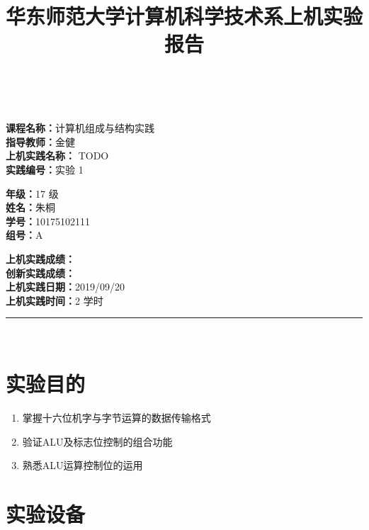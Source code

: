 \documentclass[a4paper,10pt,UTF8]{paper}
\title{华东师范大学计算机科学技术系上机实验报告}
\numberwithin{equation}{section}
\numberwithin{figure}{section}
\begin{document}
\pagestyle{fancy}
\lhead{}
\rhead{}
\makeatletter
\def\headrule{{\if@fancyplain\let\headrulewidth\plainheadrulewidth\fi%
\color{gray}\hrule\@height 0.2pt\@width\headwidth}
  \vspace{6mm}}
\makeatother

\newcommand{\HRule}{\rule{\linewidth}{1mm}}
\newcommand{\dai}{\textbf{Dais-CMX16$^+$}}

{ \\ [0.8cm]

\small{
  \begin{minipage}[t]{.32\linewidth}
    \textbf{课程名称：}计算机组成与结构实践\\
    \textbf{指导教师：}金健\\
    \textbf{上机实践名称：} TODO\\
    \textbf{实践编号：}实验 1
  \end{minipage}
  \begin{minipage}[t]{.32\linewidth}
    \textbf{年级：}17 级\\
    \textbf{姓名：}朱桐\\
    \textbf{学号：}10175102111\\
    \textbf{组号：}A
  \end{minipage} 
  \begin{minipage}[t]{.32\linewidth}
    \textbf{上机实践成绩：} \\
    \textbf{创新实践成绩：} \\
    \textbf{上机实践日期：}2019/09/20\\
    \textbf{上机实践时间：}2 学时\\
  \end{minipage}
}
\HRule \\[0.5cm]
}
\section{实验目的}

\begin{enumerate}
    \item 掌握十六位机字与字节运算的数据传输格式
    \item 验证ALU及标志位控制的组合功能
    \item 熟悉ALU运算控制位的运用
\end{enumerate}

\section{实验设备}
\end{document}
